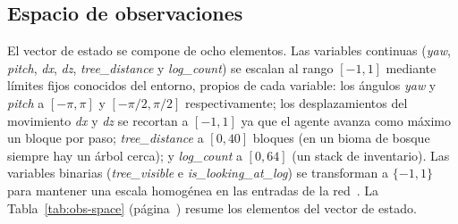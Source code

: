 \subsection{Espacio de observaciones}
El vector de estado se compone de ocho elementos. Las variables continuas (\textit{yaw}, \textit{pitch},
\textit{dx}, \textit{dz}, \textit{tree\_distance} y \textit{log\_count}) se escalan al rango $[-1,1]$ mediante
límites fijos conocidos del entorno, propios de cada variable: los ángulos \textit{yaw} y \textit{pitch} a
$[-\pi,\pi]$ y $[-\pi/2,\pi/2]$ respectivamente; los desplazamientos del movimiento \textit{dx} y \textit{dz} se recortan a $[-1,1]$
ya que el agente avanza como máximo un bloque por paso; \textit{tree\_distance} a $[0,40]$ bloques (en un
\gls{bioma} de bosque siempre hay un árbol cerca); y \textit{log\_count} a $[0,64]$ (un \gls{stack}
de inventario). Las variables binarias (\textit{tree\_visible} e \textit{is\_looking\_at\_log}) se transforman
a $\{-1,1\}$ para mantener una escala homogénea en las entradas de la red~\cite{DBLP:series/lncs/LeCunBOM12}.
La Tabla~\ref{tab:obs-space} (página~\pageref{tab:obs-space}) resume los elementos del vector de estado.

\begin{table}[htbp]
  \centering
  \caption[Elementos del vector de estado]{Elementos del vector de estado.}
  \label{tab:obs-space}
\end{table}

